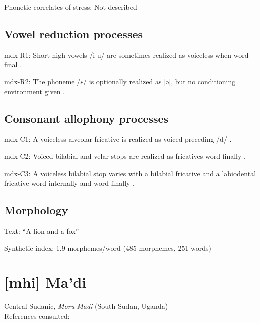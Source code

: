 {\begin{appendixdesc}
\item[Phonetic correlates of stress:] Not described
\end{appendixdesc}
\subsection*{Vowel reduction processes}
\begin{appendixdesc}

\item[mdx-R1:] Short high vowels /i u/ are sometimes realized as voiceless when word-final \citep[35--36]{Beachy2005}.

\item[mdx-R2:] The phoneme /ɛ/ is optionally realized as [ə], but no conditioning environment given \citep[37]{Beachy2005}.
\end{appendixdesc}
\subsection*{Consonant allophony processes}
\begin{appendixdesc}

\item[mdx-C1:] A voiceless alveolar fricative is realized as voiced preceding /d/ \citep[26]{Beachy2005}.

\item[mdx-C2:] Voiced bilabial and velar stops are realized as fricatives word-finally \citep[17]{Beachy2005}.

\item[mdx-C3:] A voiceless bilabial stop varies with a bilabial fricative and a labiodental fricative word-internally and word-finally \citep[17]{Beachy2005}.
\end{appendixdesc}
\subsection*{Morphology}

\begin{appendixdesc}

\item[Text:] “A lion and a fox” \citep[154--158]{Beachy2005}

\item[Synthetic index:] 1.9 morphemes/word (485 morphemes, 251 words)
\end{appendixdesc}
\section*{[mhi] Ma’di}   %
Central Sudanic, \textit{Moru-Madi} (South Sudan, Uganda)\medskip\\
References consulted: \citet{BlackingsFabb2003}

}
